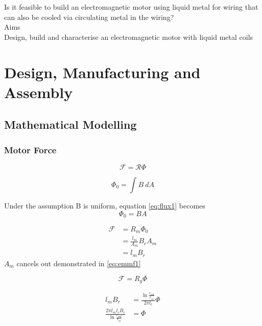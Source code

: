 \documentclass[a4paper,12pt]{article}
\begin{document}
Is it feasible to build an electromagnetic motor using liquid metal for wiring that can also be cooled via circulating metal in the wiring? \\

Aims \\

Design, build and characterise an electromagnetic motor with liquid metal coils\\

\newpage

\section{Design, Manufacturing and Assembly}
\subsection{Mathematical Modelling}
\subsubsection{Motor Force}
\begin{equation} \label{eq:emmfdef}
\mathcal{F}=\mathcal{R} \Phi
\end{equation}

\begin{equation} \label{eq:flux1}
\Phi_0 = \int{B\ dA}
\end{equation}

Under the assumption B is uniform, equation \ref{eq:flux1} becomes
\begin{equation}
\Phi_0 = BA
\end{equation}

\begin{equation}\label{eq:emmf1}
\begin{split}
\mathcal{F} & = R_m \Phi_0\\
& = \frac{l_m}{A_m}B_r A_m\\
& = l_m B_r
\end{split}
\end{equation}
$A_m$ cancels out demonstrated in \ref{eq:emmf1}

\begin{equation}\label{eq:emmfreal}
\mathcal{F}=R_g\Phi
\end{equation}

\begin{equation}\label{eq:emmfsubbed}
\begin{split}
l_m B_r & = \frac{\ln{\frac{r_{out}}{r_{in}}}}{2\pi l_c}\Phi\\
\frac{2\pi l_m l_c B_r}{\ln{\frac{r_{out}}{r_{in}}}} & = \Phi\\
\end{split}
\end{equation}
\end{document}
